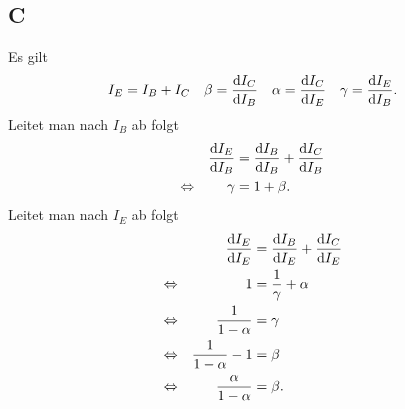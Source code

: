 \documentclass[a4paper,10pt]{article}
\numberwithin{equation}{section}
\begin{document}
\begin{multicols}{2}
\subsection{C}
Es gilt 
\begin{align} 
        I_E&=I_B+I_C&\beta &=\diff[]{I_C}{I_B}&\alpha &=\diff[]{I_C}{I_E}&\gamma &=\diff[]{I_E}{I_B}
.\end{align} 
Leitet man nach $I_B$ ab folgt 
\begin{align} 
        &&\diff[]{I_E}{I_B}&=\diff[]{I_B}{I_B}+\diff[]{I_C}{I_B}&&\\
        \Leftrightarrow &&\gamma &=1+\beta .&&
\end{align} 
Leitet man nach $I_E$ ab folgt
\begin{align} 
        &&\diff[]{I_E}{I_E}&=\diff[]{I_B}{I_E}+\diff[]{I_C}{I_E}&&\\
        \Leftrightarrow &&1&=\dfrac{1}{\gamma }+\alpha &&\nonumber \\
        \Leftrightarrow &&\dfrac{1}{1-\alpha }&=\gamma &&\nonumber \\
        \Leftrightarrow &&\dfrac{1}{1-\alpha }-1&=\beta &&\nonumber \\
        \Leftrightarrow &&\dfrac{\alpha }{1-\alpha }&=\beta .&&
\end{align} 


\end{multicols}
\end{document}
